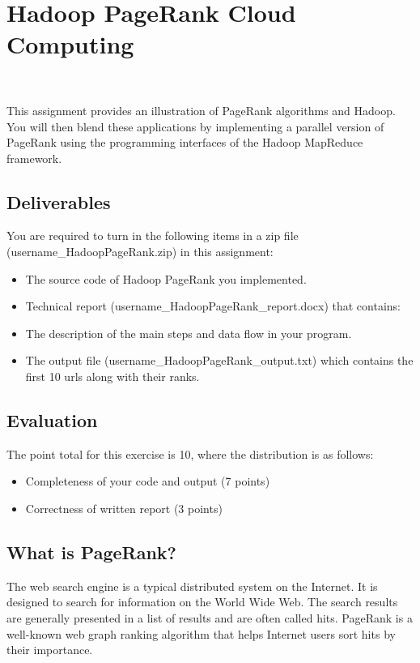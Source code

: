 
\section{Hadoop PageRank Cloud Computing}
\FILENAME\


 
This assignment provides an illustration of PageRank algorithms and Hadoop. You
will then blend these applications by implementing a parallel version of
PageRank using the programming interfaces of the Hadoop MapReduce framework. 


\subsection{Deliverables}
You are required to turn in the following items in a zip file
(username\_HadoopPageRank.zip) in this assignment: 

\begin{itemize}
\item The source code of Hadoop PageRank you implemented.
\item Technical report (username\_HadoopPageRank\_report.docx) that contains: 
\item The description of the main steps and data flow in your program. 
\item The output file (username\_HadoopPageRank\_output.txt) which contains the
  first 10 urls along with their ranks. 

\end{itemize}

\subsection{Evaluation}
The point total for this exercise is 10, where the distribution is as follows:
\begin{itemize}
\item Completeness of your code and output (7 points)
\item Correctness of written report (3 points)
\end{itemize}

\subsection{What is PageRank?}
The web search engine is a typical distributed system on the Internet. It is
designed to search for information on the World Wide Web. The search results
are generally presented in a list of results and are often called hits.
PageRank is a well-known web graph ranking algorithm that helps Internet users
sort hits by their importance. 

